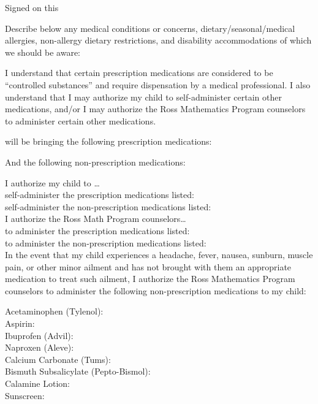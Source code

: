 \documentclass{ross}
\begin{document}
\vfill

Signed  on this 

\pagebreak\null\vspace{-1in}

Describe below any medical conditions or concerns,
dietary/seasonal/medical allergies, non-allergy dietary restrictions,
and disability accommodations of which we should be aware:

\vspace{0.4in}

I understand that certain prescription medications are considered to
be ``controlled substances'' and require dispensation by a medical
professional. I also understand that I may authorize my child to
self-administer certain other medications, and/or I may authorize the
Ross Mathematics Program counselors to administer certain other
medications.

 will be bringing the following prescription medications:

\vspace{0.4in}

And the following non-prescription medications:

\vspace{0.7in}

I authorize my child to \ldots \\
self-administer the \phantom{non-}prescription medications listed:   \\
self-administer the non-prescription medications listed:   \\

I authorize the Ross Math Program counselors\ldots\\
to administer the \phantom{non-}prescription medications listed:   \\
to administer the non-prescription medications listed:   \\

In the event that my child experiences a headache, fever, nausea,
sunburn, muscle pain, or other minor ailment and has not brought with
them an appropriate medication to treat such ailment, I authorize the
Ross Mathematics Program counselors to administer the following
non-prescription medications to my child:

  Acetaminophen (Tylenol):   \\
  Aspirin:   \\
Ibuprofen (Advil):    \\ Naproxen (Aleve):    \\
Calcium Carbonate (Tums):   \\
Bismuth Subsalicylate (Pepto-Bismol):    \\
Calamine Lotion:   \\ Sunscreen:    \\
\end{document}
